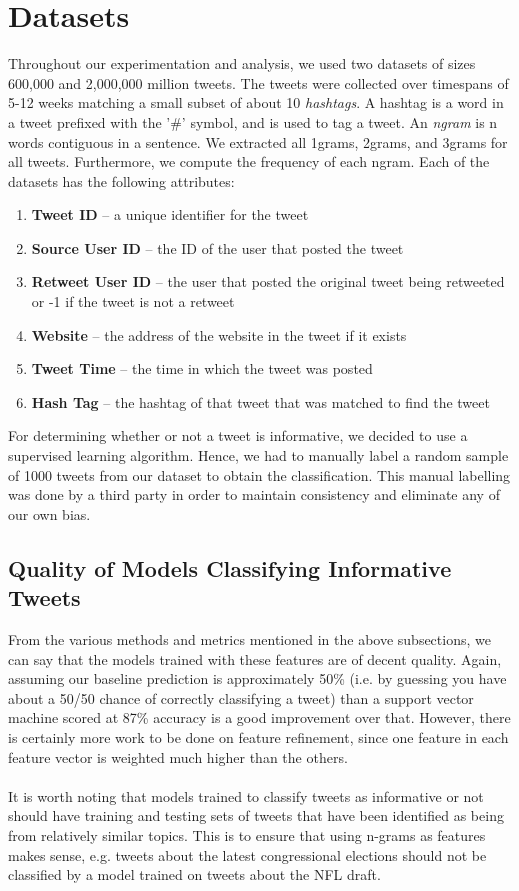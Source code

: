 \documentclass[12pt]{article}
\begin{document}
\section{Datasets}
Throughout our experimentation and analysis, we used two datasets of sizes 600,000 and 2,000,000 million tweets. The tweets were collected over timespans of 5-12 weeks matching a small subset of about 10 {\it hashtags}. A hashtag is a word in a tweet prefixed with the '\#' symbol, and is used to tag a tweet. An {\it ngram} is n words contiguous in a sentence. We extracted all 1grams, 2grams, and 3grams for all tweets. Furthermore, we compute the frequency of each ngram. Each of the datasets has the following attributes:
\begin{enumerate}
	\item \textbf{Tweet ID} -- a unique identifier for the tweet
	\item \textbf{Source User ID} -- the ID of the user that posted the tweet
	\item \textbf{Retweet User ID} -- the user that posted the original tweet being retweeted or -1 if the tweet is not a retweet
	\item \textbf{Website} -- the address of the website in the tweet if it exists
	\item \textbf{Tweet Time} -- the time in which the tweet was posted
	\item \textbf{Hash Tag} -- the hashtag of that tweet that was matched to find the tweet
\end{enumerate}
For determining whether or not a tweet is informative, we decided to use a supervised learning algorithm. Hence, we had to manually label a random sample of 1000 tweets from our dataset to obtain the classification. This manual labelling was done by a third party in order to maintain consistency and eliminate any of our own bias.
\subsection{Quality of Models Classifying Informative Tweets}
From the various methods and metrics mentioned in the above subsections, we can say that the models trained with these features are of decent quality. Again, assuming our baseline prediction is approximately 50\% (i.e. by guessing you have about a 50/50 chance of correctly classifying a tweet) than a support vector machine scored at 87\% accuracy is a good improvement over that. However, there is certainly more work to be done on feature refinement, since one feature in each feature vector is weighted much higher than the others. \\
\\
It is worth noting that models trained to classify tweets as informative or not should have training and testing sets of tweets that have been identified as being from relatively similar topics. This is to ensure that using n-grams as features makes sense, e.g. tweets about the latest congressional elections should not be classified by a model trained on tweets about the NFL draft. 
\end{document}

